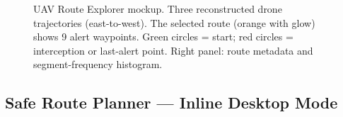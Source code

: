 \documentclass[12pt,a4paper]{article}
\begin{document}
\begin{figure}[H]
\caption{UAV Route Explorer mockup. Three reconstructed drone trajectories
  (east-to-west). The selected route (orange with glow) shows 9 alert waypoints.
  Green circles = start; red circles = interception or last-alert point.
  Right panel: route metadata and segment-frequency histogram.}
\label{fig:uav_mockup}
\end{figure}

\subsection{Safe Route Planner --- Inline Desktop Mode}
\end{document}
